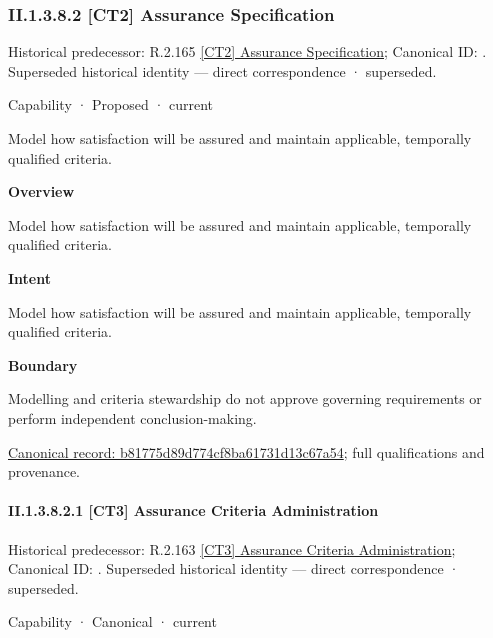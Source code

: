 \subsubsection*{II.1.3.8.2 [CT2] Assurance Specification}
\label{navigation:II.1.3.8.2}

{\small Historical predecessor: R.2.165 \hyperref[element:8006ee0dd95f4d7fb1f408fa09b6ce19]{[CT2] Assurance Specification}; Canonical ID: \texttt{}. Superseded historical identity — direct correspondence · superseded.}\par
\label{element:b81775d89d774cf8ba61731d13c67a54}
{\small Capability · Proposed · current}\par

Model how satisfaction will be assured and maintain applicable, temporally qualified criteria.



\textbf{Overview}



Model how satisfaction will be assured and maintain applicable, temporally qualified criteria.



\textbf{Intent}



Model how satisfaction will be assured and maintain applicable, temporally qualified criteria.



\textbf{Boundary}



Modelling and criteria stewardship do not approve governing requirements or perform independent conclusion-making.


{\footnotesize \href{../../../../../../../continuum/strategy/capability/b81775d89d774cf8ba61731d13c67a54.md}{Canonical record: b81775d89d774cf8ba61731d13c67a54}; full qualifications and provenance.}\par
\paragraph*{II.1.3.8.2.1 [CT3] Assurance Criteria Administration}
\label{navigation:II.1.3.8.2.1}

{\small Historical predecessor: R.2.163 \hyperref[element:6dab08ab1e3249d7b314843ca9ed0149]{[CT3] Assurance Criteria Administration}; Canonical ID: \texttt{}. Superseded historical identity — direct correspondence · superseded.}\par
\label{element:1bfd71f24321428c8871b587d413f47e}
{\small Capability · Canonical · current}\par

